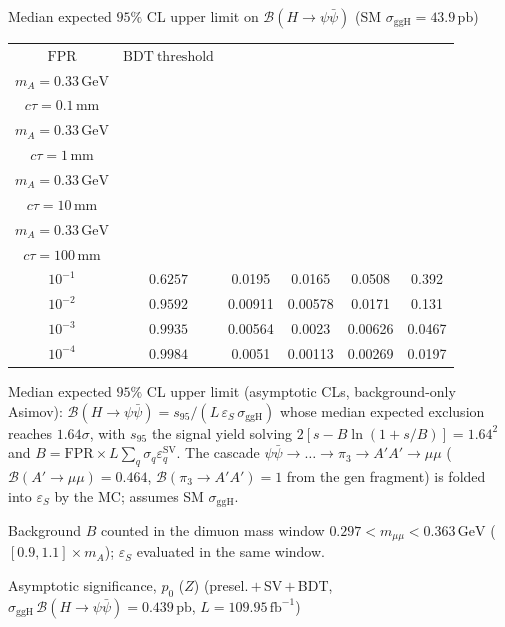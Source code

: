 \documentclass[10pt,a4paper]{article}
\begin{document}
{\vspace{12pt}

Median expected $95\%$ CL upper limit on $\mathcal{B}(H\to\psi\bar{\psi})$ (SM $\sigma_{\mathrm{ggH}}=43.9\,\mathrm{pb}$)

\begin{tabular}{cccccc}
\toprule
$\mathrm{FPR}$ & $\mathrm{BDT\ threshold}$ & \shortstack{$m_{\pi}=1\,\mathrm{GeV}$\\$m_{A}=0.33\,\mathrm{GeV}$\\$c\tau=0.1\,\mathrm{mm}$} & \shortstack{$m_{\pi}=1\,\mathrm{GeV}$\\$m_{A}=0.33\,\mathrm{GeV}$\\$c\tau=1\,\mathrm{mm}$} & \shortstack{$m_{\pi}=1\,\mathrm{GeV}$\\$m_{A}=0.33\,\mathrm{GeV}$\\$c\tau=10\,\mathrm{mm}$} & \shortstack{$m_{\pi}=1\,\mathrm{GeV}$\\$m_{A}=0.33\,\mathrm{GeV}$\\$c\tau=100\,\mathrm{mm}$} \\
\midrule
$10^{-1}$ & $0.6257$ & 0.0195 & 0.0165 & 0.0508 & 0.392\\
$10^{-2}$ & $0.9592$ & 0.00911 & 0.00578 & 0.0171 & 0.131\\
$10^{-3}$ & $0.9935$ & 0.00564 & 0.0023 & 0.00626 & 0.0467\\
$10^{-4}$ & $0.9984$ & 0.0051 & 0.00113 & 0.00269 & 0.0197\\
\bottomrule
\end{tabular}

{\small Median expected $95\%$ CL upper limit (asymptotic CLs, background-only Asimov): $\mathcal{B}(H\to\psi\bar{\psi})=s_{95}/(L\,\varepsilon_S\,\sigma_{\mathrm{ggH}})$ whose median expected exclusion reaches $1.64\sigma$, with $s_{95}$ the signal yield solving $2[s-B\ln(1{+}s/B)]=1.64^2$ and $B=\mathrm{FPR}\times L\sum_q\sigma_q\varepsilon_q^{\mathrm{SV}}$. The cascade $\psi\bar{\psi}\to\ldots\to\pi_3\to A'A'\to\mu\mu$ ($\mathcal{B}(A'\to\mu\mu)=0.464$, $\mathcal{B}(\pi_3\to A'A')=1$ from the gen fragment) is folded into $\varepsilon_S$ by the MC; assumes SM $\sigma_{\mathrm{ggH}}$.}

{\small Background $B$ counted in the dimuon mass window $0.297<m_{\mu\mu}<0.363\,\mathrm{GeV}$ ($[0.9,1.1]\times m_A$); $\varepsilon_S$ evaluated in the same window.}

\vspace{12pt}

Asymptotic significance, $p_0$ ($Z$) (presel.\,$+$\,SV\,$+$\,BDT, $\sigma_{\mathrm{ggH}}\,\mathcal{B}(H\to\psi\bar{\psi})=0.439\,\mathrm{pb}$, $L=109.95\,\mathrm{fb}^{-1}$)

}
\end{document}
